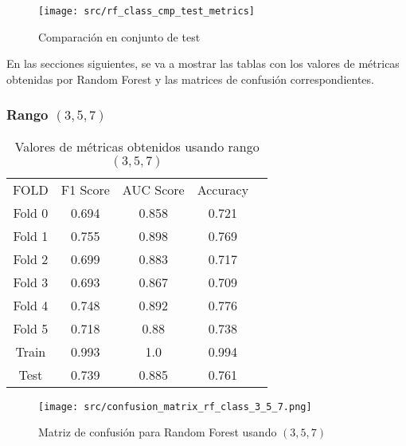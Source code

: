 \begin{figure}[H]
	\centering
	\texttt{[image: src/rf\_class\_cmp\_test\_metrics]}
	\caption{Comparación en conjunto de test}
	\label{fig:rf_class_cmp_test}
\end{figure}
En las secciones siguientes, se va a mostrar las tablas con los valores de métricas obtenidas por Random Forest y las matrices de confusión correspondientes.
\subsubsection*{Rango $(3,5,7)$}
\begin{table}[H]
	\centering
	\begin{tabular}{|c|c|c|c|c}
		\cline{1-4}
		FOLD   & F1 Score & AUC Score & Accuracy \\ \cline{1-4}
		Fold 0 & 0.694    & 0.858     & 0.721    \\ \cline{1-4}
		Fold 1 & 0.755    & 0.898     & 0.769    \\ \cline{1-4}
		Fold 2 & 0.699    & 0.883     & 0.717    \\ \cline{1-4}
		Fold 3 & 0.693    & 0.867     & 0.709    \\ \cline{1-4}
		Fold 4 & 0.748    & 0.892     & 0.776    \\ \cline{1-4}
		Fold 5 & 0.718    & 0.88      & 0.738    \\ \cline{1-4}
		Train  & 0.993    & 1.0       & 0.994    \\\cline{1-4}
		Test   & 0.739    & 0.885     & 0.761    \\ \cline{1-4}
	\end{tabular}
	\caption{Valores de métricas obtenidos usando rango $(3,5,7)$}
\end{table}
\begin{figure}[H]
	\centering
	\texttt{[image: src/confusion\_matrix\_rf\_class\_3\_5\_7.png]}
	\caption{Matriz de confusión para Random Forest usando $(3,5,7)$}
	\label{fig:confusion_matrix_rf1}
\end{figure}


